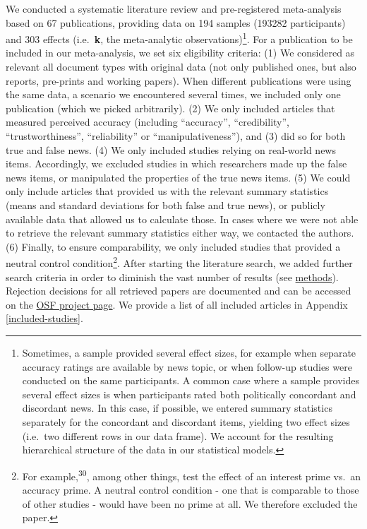 \documentclass[
  doc,floatsintext]{apa6}
\begin{document}
We conducted a systematic literature review and pre-registered meta-analysis based on 67 publications, providing data on 194 samples (193282 participants) and 303 effects (i.e.~\textbf{k}, the meta-analytic observations)\footnote{Sometimes, a sample provided several effect sizes, for example when separate accuracy ratings are available by news topic, or when follow-up studies were conducted on the same participants. A common case where a sample provides several effect sizes is when participants rated both politically concordant and discordant news. In this case, if possible, we entered summary statistics separately for the concordant and discordant items, yielding two effect sizes (i.e.~two different rows in our data frame). We account for the resulting hierarchical structure of the data in our statistical models.}. For a publication to be included in our meta-analysis, we set six eligibility criteria: (1) We considered as relevant all document types with original data (not only published ones, but also reports, pre-prints and working papers). When different publications were using the same data, a scenario we encountered several times, we included only one publication (which we picked arbitrarily). (2) We only included articles that measured perceived accuracy (including ``accuracy'', ``credibility'', ``trustworthiness'', ``reliability'' or ``manipulativeness''), and (3) did so for both true and false news. (4) We only included studies relying on real-world news items. Accordingly, we excluded studies in which researchers made up the false news items, or manipulated the properties of the true news items. (5) We could only include articles that provided us with the relevant summary statistics (means and standard deviations for both false and true news), or publicly available data that allowed us to calculate those. In cases where we were not able to retrieve the relevant summary statistics either way, we contacted the authors. (6) Finally, to ensure comparability, we only included studies that provided a neutral control condition\footnote{For example,\textsuperscript{30}, among other things, test the effect of an interest prime vs.~an accuracy prime. A neutral control condition - one that is comparable to those of other studies - would have been no prime at all. We therefore excluded the paper.}. After starting the literature search, we added further search criteria in order to diminish the vast number of results (see \hyperref[methods]{methods}). Rejection decisions for all retrieved papers are documented and can be accessed on the \href{https://osf.io/96zbp/?view_only=d2f3147f652e44e2a0414d7d6d9a6c29}{OSF project page}. We provide a list of all included articles in Appendix \ref{included-studies}.
\end{document}
